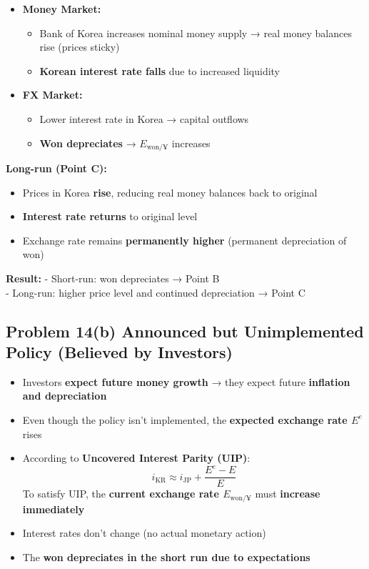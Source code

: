 \documentclass[
]{article}
\providecommand{\tightlist}{%
  \setlength{\itemsep}{0pt}\setlength{\parskip}{0pt}}
\begin{document}
\begin{itemize}
\tightlist
\item
  \textbf{Money Market:}

  \begin{itemize}
  \tightlist
  \item
    Bank of Korea increases nominal money supply → real money balances
    rise (prices sticky)
  \item
    \textbf{Korean interest rate falls} due to increased liquidity
  \end{itemize}
\item
  \textbf{FX Market:}

  \begin{itemize}
  \tightlist
  \item
    Lower interest rate in Korea → capital outflows
  \item
    \textbf{Won depreciates} → \(E_{\text{won}/¥}\) increases
  \end{itemize}
\end{itemize}

\textbf{Long-run (Point C):}

\begin{itemize}
\tightlist
\item
  Prices in Korea \textbf{rise}, reducing real money balances back to
  original
\item
  \textbf{Interest rate returns} to original level
\item
  Exchange rate remains \textbf{permanently higher} (permanent
  depreciation of won)
\end{itemize}

\textbf{Result:} - Short-run: won depreciates → Point B\\
- Long-run: higher price level and continued depreciation → Point C

\subsection{Problem 14(b) Announced but Unimplemented Policy (Believed
by
Investors)}\label{problem-14b-announced-but-unimplemented-policy-believed-by-investors}

\begin{itemize}
\tightlist
\item
  Investors \textbf{expect future money growth} → they expect future
  \textbf{inflation and depreciation}
\item
  Even though the policy isn't implemented, the \textbf{expected
  exchange rate \(E^e\)} rises
\item
  According to \textbf{Uncovered Interest Parity (UIP)}: \[
  i_{\text{KR}} \approx i_{\text{JP}} + \frac{E^e - E}{E}
  \] To satisfy UIP, the \textbf{current exchange rate
  \(E_{\text{won}/¥}\)} must \textbf{increase immediately}
\item
  Interest rates don't change (no actual monetary action)
\item
  The \textbf{won depreciates in the short run due to expectations}
\end{itemize}
\end{document}
